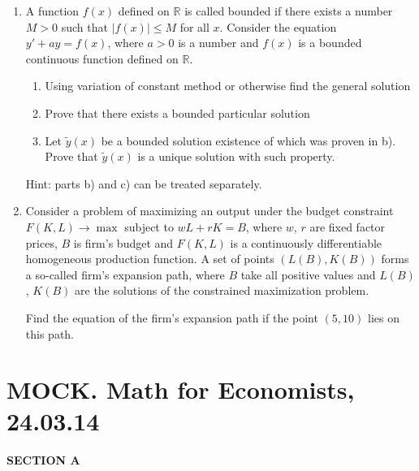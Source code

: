 \documentclass[12pt]{article}
\begin{document}
\begin{enumerate}[resume]
\item A function $f(x)$ defined on $\mathbb{R}$ is called bounded if there exists a number $M>0$ such that $|f(x)| \leq M$ for all $x$. Consider the equation $y'+ ay = f (x)$, where $a>0$ is a number and $f (x)$  is a bounded continuous function defined on $\mathbb{R}$.
\begin{enumerate}
\item  Using variation of constant method or otherwise find the general solution  
\item  Prove that there exists a bounded particular solution 
\item Let $\tilde{y}(x)$  be a bounded solution existence of which was proven in b). Prove that $\tilde{y}(x)$ is a unique solution with such property. 
\end{enumerate}
Hint: parts b) and c) can be treated separately.


\item Consider a problem of maximizing an output under the budget constraint $F(K,L) \to \max$ subject to $wL+rK=B$, where $w$, $r$ are fixed factor prices, $B$ is firm's budget and $F(K,L)$ is a continuously differentiable homogeneous production function. A set of points $(L(B),K(B))$ forms a so-called firm's expansion path, where $B$ take all positive values and $L(B)$, $K(B)$ are the solutions of the constrained maximization problem.

Find the equation of the firm's expansion path if the point $(5,10)$ lies on this path.
\end{enumerate}

\newpage

\section*{MOCK. Math for Economists, 24.03.14}

\textbf{SECTION A}
\end{document}
